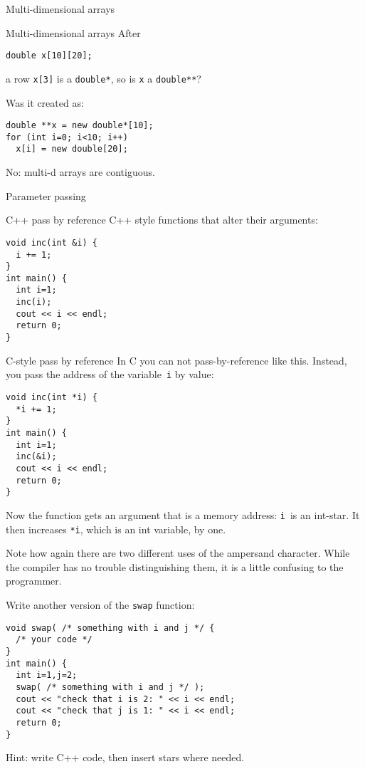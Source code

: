  {Multi-dimensional arrays}

\begin{block}{Multi-dimensional arrays}
  \label{sl:static-multi}
After
\begin{lstlisting}
double x[10][20];
\end{lstlisting}
a row \lstinline{x[3]} is a \lstinline{double*}, so is \lstinline{x} a \lstinline{double**}?

Was it created as:
\begin{lstlisting}
double **x = new double*[10];
for (int i=0; i<10; i++)
  x[i] = new double[20];
\end{lstlisting}
No: multi-d arrays are contiguous.
\end{block}

 {Parameter passing}

\begin{block}{C++ pass by reference}
  \label{sl:cpp-pass-ref}
  C++ style functions that alter their arguments:
\begin{lstlisting}
void inc(int &i) {
  i += 1;
}
int main() {
  int i=1;
  inc(i);
  cout << i << endl;
  return 0;
}
\end{lstlisting}
\end{block}

\begin{block}{C-style pass by reference}
  \label{sl:c-pass-ref}
  In C you can not pass-by-reference like this. Instead, you pass the
  address of the variable~\lstinline{i} by value:
\begin{lstlisting}
void inc(int *i) {
  *i += 1;
}
int main() {
  int i=1;
  inc(&i);
  cout << i << endl;
  return 0;
}
\end{lstlisting}
Now the function gets an argument that is a memory address: \lstinline{i}~is
an int-star. It then increases \lstinline{*i}, which is an int variable, by one.
\end{block}

Note how again there are two different uses of the ampersand
character.  While the compiler has no trouble distinguishing them, it
is a little confusing to the programmer.

\begin{exercise}
  \label{ex:c-star-swap}
  Write another version of the \lstinline{swap} function:
\begin{lstlisting}
void swap( /* something with i and j */ {
  /* your code */
}
int main() {
  int i=1,j=2;
  swap( /* something with i and j */ );
  cout << "check that i is 2: " << i << endl;
  cout << "check that j is 1: " << i << endl;
  return 0;
}
\end{lstlisting}
Hint: write C++ code, then insert stars where needed.
\end{exercise}

